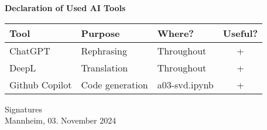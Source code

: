 \documentclass[a4paper,oneside,bibliography=totoc]{scrartcl}
\begin{document}
\begin{center}
  \textbf{Declaration of Used AI Tools} \\[.3em]
  \begin{tabularx}{\textwidth}{lXlc}
    \toprule
    Tool & Purpose & Where? & Useful? \\
    \midrule
    ChatGPT & Rephrasing & Throughout & + \\
    DeepL & Translation & Throughout & + \\
    Github Copilot & Code generation & a03-svd.ipynb & + \\
    \bottomrule
  \end{tabularx}
\end{center}

\vspace{2cm}
\noindent Signatures\\
\noindent Mannheim, 03. November 2024 \hfill
\end{document}
